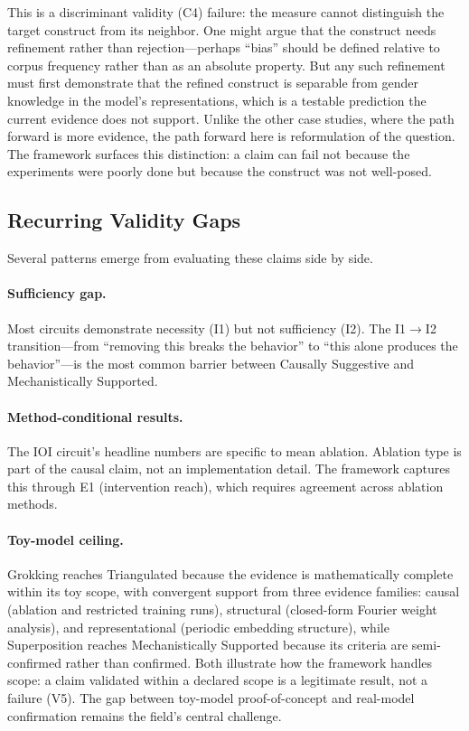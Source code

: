 \documentclass[10pt]{article}
\begin{document}
This is a discriminant validity (C4) failure: the measure cannot distinguish the target construct from its neighbor. One might argue that the construct needs refinement rather than rejection---perhaps ``bias'' should be defined relative to corpus frequency rather than as an absolute property. But any such refinement must first demonstrate that the refined construct is separable from gender knowledge in the model's representations, which is a testable prediction the current evidence does not support. Unlike the other case studies, where the path forward is more evidence, the path forward here is reformulation of the question. The framework surfaces this distinction: a claim can fail not because the experiments were poorly done but because the construct was not well-posed.

\subsection{Recurring Validity Gaps}

Several patterns emerge from evaluating these claims side by side.

\paragraph{Sufficiency gap.} Most circuits demonstrate necessity (I1) but not sufficiency (I2). The I1$\rightarrow$I2 transition---from ``removing this breaks the behavior'' to ``this alone produces the behavior''---is the most common barrier between Causally Suggestive and Mechanistically Supported.

\paragraph{Method-conditional results.} The IOI circuit's headline numbers are specific to mean ablation. Ablation type is part of the causal claim, not an implementation detail. The framework captures this through E1 (intervention reach), which requires agreement across ablation methods.

\paragraph{Toy-model ceiling.} Grokking reaches Triangulated because the evidence is mathematically complete within its toy scope, with convergent support from three evidence families: causal (ablation and restricted training runs), structural (closed-form Fourier weight analysis), and representational (periodic embedding structure), while Superposition reaches Mechanistically Supported because its criteria are semi-confirmed rather than confirmed. Both illustrate how the framework handles scope: a claim validated within a declared scope is a legitimate result, not a failure (V5). The gap between toy-model proof-of-concept and real-model confirmation remains the field's central challenge.
\end{document}

